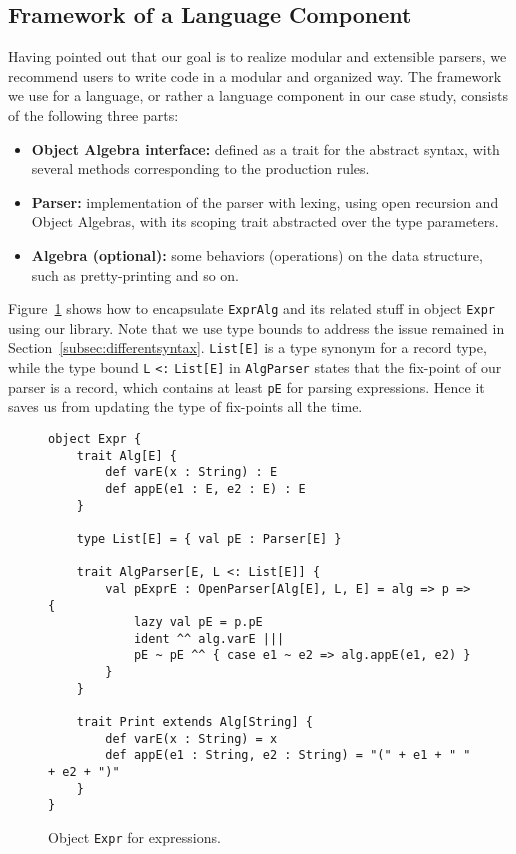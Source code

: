 \subsection{Framework of a Language Component}\label{subsec:framework}


Having pointed out that our goal is to realize modular and extensible parsers, we recommend users to write code in a modular and
organized way. The framework we use for a language, or rather a language component in our case study, consists of the following three
parts:
\begin{itemize}
    \item \textbf{Object Algebra interface:} defined as a trait for the abstract syntax, with several methods corresponding to the production rules. 
\item \textbf{Parser:} implementation of the parser with lexing, using open recursion and Object Algebras, with its scoping trait abstracted over the type parameters.
\item \textbf{Algebra (optional):} some behaviors (operations) on the data structure, such as pretty-printing and so on.
\end{itemize}

Figure~\ref{fig:objectexpr} shows how to encapsulate \lstinline{ExprAlg} and its related stuff in object \lstinline{Expr} using our library. Note that we use type bounds to address the issue remained in Section~\ref{subsec:differentsyntax}. \lstinline{List[E]} is a type synonym for a record type, while the type bound \lstinline{L} \lstinline{<:} \lstinline{List[E]} in \lstinline{AlgParser} states that the fix-point of our parser is a record, which contains at least \lstinline{pE} for parsing expressions. Hence it saves us from updating the type of fix-points all the time.

\begin{figure}[htbp]
\centering
\begin{lstlisting}
object Expr {
    trait Alg[E] {
        def varE(x : String) : E
        def appE(e1 : E, e2 : E) : E
    }

    type List[E] = { val pE : Parser[E] }

    trait AlgParser[E, L <: List[E]] {
        val pExprE : OpenParser[Alg[E], L, E] = alg => p => {
            lazy val pE = p.pE
            ident ^^ alg.varE |||
            pE ~ pE ^^ { case e1 ~ e2 => alg.appE(e1, e2) }
        }
    }

    trait Print extends Alg[String] {
        def varE(x : String) = x
        def appE(e1 : String, e2 : String) = "(" + e1 + " " + e2 + ")"
    }
}
\end{lstlisting}
\caption{Object \lstinline{Expr} for expressions.}\label{fig:objectexpr}
\end{figure}

